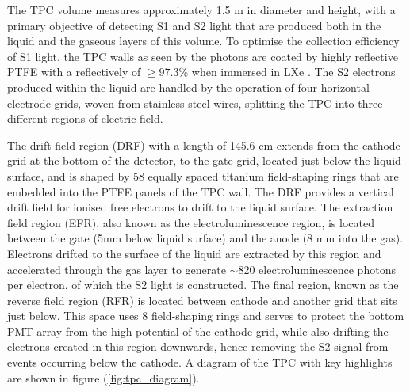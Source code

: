 The TPC volume measures approximately 1.5 m in diameter and height, with a primary objective of detecting S1 and S2 light that are produced both in the liquid and the gaseous layers of this volume. To optimise the collection efficiency of S1 light, the TPC walls as seen by the photons are coated by highly reflective PTFE with a reflectively of $\geq97.3\%$ when immersed in LXe \cite{Neves_2017}. The S2 electrons produced within the liquid are handled by the operation of four horizontal electrode grids, woven from stainless steel wires, splitting the TPC into three different regions of electric field.

The drift field region (DRF) with a length of 145.6 cm extends from the cathode grid at the bottom of the detector, to the gate grid, located just below the liquid surface, and is shaped by 58 equally spaced titanium field-shaping rings that are embedded into the PTFE panels of the TPC wall. The DRF provides a vertical drift field for ionised free electrons to drift to the liquid surface. The extraction field region (EFR), also known as the electroluminescence region, is located between the gate (5mm below liquid surface) and the anode (8 mm into the gas). Electrons drifted to the surface of the liquid are extracted by this region and accelerated through the gas layer to generate $\sim$820 electroluminescence photons per electron, of which the S2 light is constructed. The final region, known as the reverse field region (RFR) is located between cathode and another grid that sits just below. This space uses 8 field-shaping rings and serves to protect the bottom PMT array from the high potential of the cathode grid, while also drifting the electrons created in this region downwards, hence removing the S2 signal from events occurring below the cathode. A diagram of the TPC with key highlights are shown in figure (\ref{fig:tpc_diagram}).

